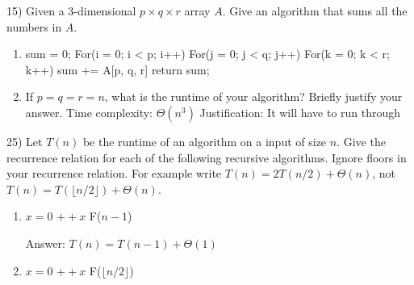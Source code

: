 \documentclass[12pt]{article}
\newenvironment{problem}[2][Problem]{\begin{trivlist}
\item[\hskip \labelsep {\bfseries #1}\hskip \labelsep {\bfseries #2.}]}{\end{trivlist}}
\begin{document}
\begin{problem}{5}(15)
Given a 3-dimensional $p \times q \times r$ array $A$. Give an algorithm that sums all the 
numbers in $A$.

\begin{enumerate}
\item
\begin{algorithm}[H]
\begin{algorithmic}
\State sum = 0; 
  \State For(i = 0; i < p; i++) 
    \State \indent For(j = 0; j < q; j++)
        \State \indent \indent For(k = 0; k < r; k++){
                    \State \indent \indent \indent sum += A[p, q, r]
            }
            \State return sum;
\EndProcedure
\end{algorithmic}
\end{algorithm}

\item If $p = q = r = n$, what is the runtime of your algorithm? Briefly justify your answer.
\newline Time complexity: $\Theta(n^3)$
\newline Justification: It will have to run through
\end{enumerate}


\begin{problem}{6}(25)
Let $T(n)$ be the runtime of an algorithm on a input of size $n$.
Give the recurrence relation for each of the following recursive algorithms. Ignore floors
in your recurrence relation. For example write $T(n) = 2T(n/2) + \Theta(n)$, not
$T(n) = T(\lfloor n/2 \rfloor) + \Theta(n)$.
\begin{enumerate}
 
\item
\begin{algorithm}[H]
\begin{algorithmic}
  \State {}
\Else
  \State $x = 0$
    \State $++x$
  \EndFor
  \State F($n-1$)  
\EndIf
\EndProcedure
\end{algorithmic}
\end{algorithm}

\noindent
Answer: $T(n) = T(n-1) + \Theta (1)$
 
\item
\begin{algorithm}[H]
\begin{algorithmic}
  \State {}
\Else
  \State $x = 0$
    \State $++x$
  \EndFor
  \State F($\lfloor n/2 \rfloor$)  
\EndIf
\EndProcedure
\end{algorithmic}
\end{algorithm}


\end{enumerate}
\end{problem}
\end{problem}
\end{document}
